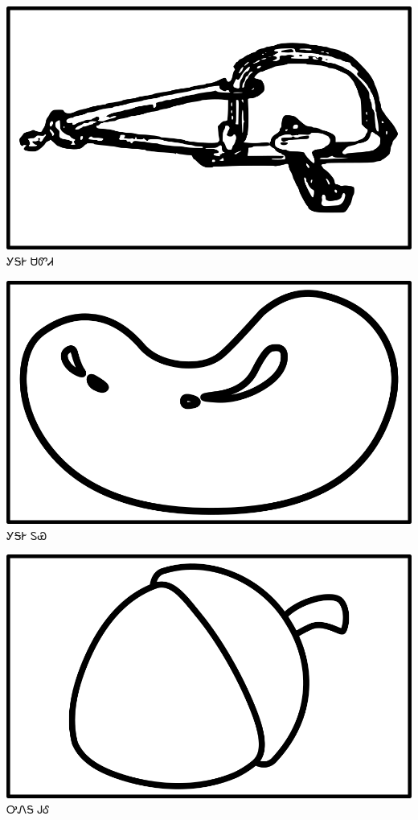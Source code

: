 \documentclass[avery5371]{flashcards}%
\begin{document}
    \begin{flashcard}{
        \includegraphics[width=0.95\columnwidth,height=.51\columnwidth,keepaspectratio]{../artwork/objects-neutral/sadvdi}
    }
        \Huge ᎩᎦᎨ ᏌᏛᏗ
    \end{flashcard}

    \begin{flashcard}{
        \includegraphics[width=0.95\columnwidth,height=.51\columnwidth,keepaspectratio]{../artwork/objects-neutral/tuya}
    }
        \Huge ᎩᎦᎨ ᏚᏯ
    \end{flashcard}

    \begin{flashcard}{
        \includegraphics[width=0.95\columnwidth,height=.51\columnwidth,keepaspectratio]{../artwork/objects-neutral/gule}
    }
        \Huge ᎤᏁᎦ ᎫᎴ
    \end{flashcard}
\end{document}
